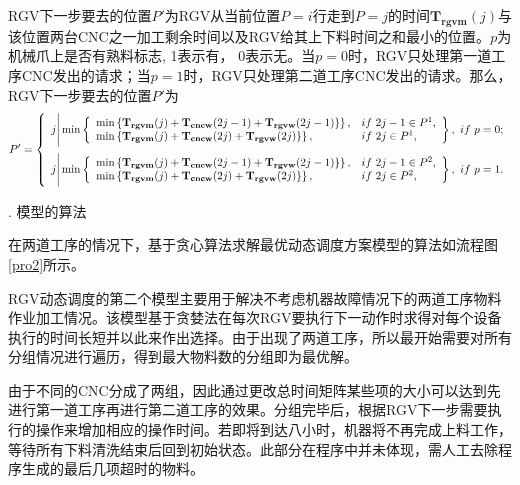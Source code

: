 \documentclass[no-math,withoutpreface,bwprint]{cumcmthesis} %
\numberwithin{equation}{section}
\numberwithin{figure}{section}
\numberwithin{table}{section}
\begin{document}
\begin{principle}
RGV下一步要去的位置$P'$为RGV从当前位置$P=i$行走到$P=j$的时间$\mathbf{T_{rgvm}}(j)$与该位置两台CNC之一加工剩余时间以及RGV给其上下料时间之和最小的位置。$p$为机械爪上是否有熟料标志, {\rm1}表示有， {\rm0}表示无。当$p=0$时，RGV只处理第一道工序CNC发出的请求；当$p=1$时，RGV只处理第二道工序CNC发出的请求。那么，RGV下一步要去的位置$P'$为
\begin{equation}
P'=\left\{\begin{array}{l}
j\Bigg|\min\left\{\begin{array}{ll}
\min\left\{\mathbf{T_{rgvm}}(j)+\mathbf{T_{cncw}}(2j-1)+\mathbf{T_{rgvw}}(2j-1)\}\right\},& if\ 2j-1\in P^1,\\
\min\left\{\mathbf{T_{rgvm}}(j)+\mathbf{T_{cncw}}(2j)+\mathbf{T_{rgvw}}(2j)\}\right\},& if\ 2j\in P^1,\\
\end{array}\right\},\ if\ p=0;\vspace{0.2cm}\\
j\Bigg|\min\left\{\begin{array}{ll}
\min\left\{\mathbf{T_{rgvm}}(j)+\mathbf{T_{cncw}}(2j-1)+\mathbf{T_{rgvw}}(2j-1)\}\right\},& if\ 2j-1\in P^2,\\
\min\left\{\mathbf{T_{rgvm}}(j)+\mathbf{T_{cncw}}(2j)+\mathbf{T_{rgvw}}(2j)\}\right\},& if\ 2j\in P^2,\\
\end{array}\right\},\ if\ p=1.\\
\end{array}\right.
\end{equation}

\end{principle}

. 模型的算法

在两道工序的情况下，基于贪心算法求解最优动态调度方案模型的算法如流程图
\ref{pro2}所示。

RGV动态调度的第二个模型主要用于解决不考虑机器故障情况下的两道工序物料作业加工情况。该模型基于贪婪法在每次RGV要执行下一动作时求得对每个设备执行的时间长短并以此来作出选择。由于出现了两道工序，所以最开始需要对所有分组情况进行遍历，得到最大物料数的分组即为最优解。

由于不同的CNC分成了两组，因此通过更改总时间矩阵某些项的大小可以达到先进行第一道工序再进行第二道工序的效果。分组完毕后，根据RGV下一步需要执行的操作来增加相应的操作时间。若即将到达八小时，机器将不再完成上料工作，等待所有下料清洗结束后回到初始状态。此部分在程序中并未体现，需人工去除程序生成的最后几项超时的物料。
\end{document}
